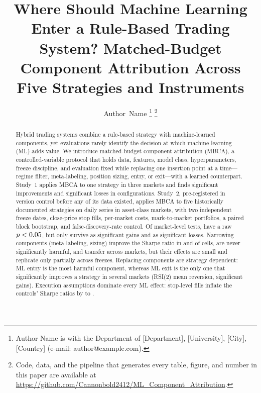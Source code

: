 \documentclass[journal]{IEEEtran}
\begin{document}
\title{Where Should Machine Learning Enter a Rule-Based Trading System? Matched-Budget Component Attribution Across
Five Strategies and \STwoInstruments{} Instruments}

\author{Author~Name%
\thanks{Author Name is with the Department of [Department], [University], [City], [Country]
(e-mail: author@example.com).}%
\thanks{Code, data, and the pipeline that generates every table, figure, and number in this paper are available at
\url{https://github.com/Cannonbold2412/ML_Component_Attribution}.}}

\maketitle

\begin{abstract}
Hybrid trading systems combine a rule-based strategy with machine-learned components, yet evaluations rarely identify
the decision at which machine learning (ML) adds value. We introduce matched-budget component attribution (MBCA), a
controlled-variable protocol that holds data, features, model class, hyperparameters, freeze discipline, and
evaluation fixed while replacing one insertion point at a time---regime filter, meta-labeling, position sizing, entry,
or exit---with a learned counterpart. Study~1 applies MBCA to one strategy in three markets and finds \SoneSigGain{}
significant improvements and \SoneSigLoss{} significant losses in \SoneConfigs{} configurations. Study~2,
pre-registered in version control before any of its data existed, applies MBCA to five historically documented
strategies on \STwoInstruments{} daily series in \STwoMarkets{} asset-class markets, with two independent freeze
dates, close-price stop fills, per-market costs, mark-to-market portfolios, a paired block bootstrap, and
false-discovery-rate control. Of \STwoMktTests{} market-level tests, \STwoMktRawSig{} have a raw $p<0.05$, but
only \STwoMktSigGain{} survive as significant gains and \STwoMktSigLoss{} as significant losses. Narrowing components
(meta-labeling, sizing) improve the Sharpe ratio in \STwoMktMetaPos{} and \STwoMktSizingPos{} of cells, are never
significantly harmful, and transfer across markets, but their effects are small and replicate only partially across
freezes. Replacing components are strategy dependent: ML entry is the most harmful component, whereas ML exit is the
only one that significantly improves a strategy in several markets (RSI(2) mean reversion, \STwoMktExitGainRSI{}
significant gains). Execution assumptions dominate every ML effect: stop-level fills inflate the controls' Sharpe ratios
by \STwoExecBaseStopMin{} to \STwoExecBaseStopMax{}.
\end{abstract}
\end{document}
